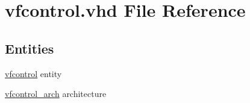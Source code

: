 \hypertarget{vfcontrol_8vhd}{}\section{vfcontrol.\+vhd File Reference}
\label{vfcontrol_8vhd}
\subsection*{Entities}
\begin{DoxyCompactItemize}
\item 
\hyperlink{classvfcontrol}{vfcontrol} entity
\item 
\hyperlink{classvfcontrol_1_1vfcontrol__arch}{vfcontrol\+\_\+arch} architecture
\end{DoxyCompactItemize}
